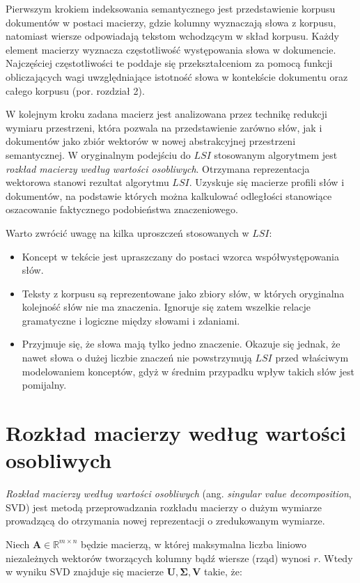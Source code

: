 \documentclass{pracamgr}
\begin{document}
Pierwszym krokiem indeksowania semantycznego jest przedstawienie korpusu dokumentów w postaci macierzy, gdzie kolumny wyznaczają słowa z korpusu, natomiast wiersze odpowiadają tekstom wchodzącym w skład korpusu. Każdy element macierzy wyznacza częstotliwość występowania słowa w dokumencie. Najczęściej częstotliwości te poddaje się przekształceniom za pomocą funkcji obliczających wagi uwzględniające istotność słowa w kontekście dokumentu oraz całego korpusu (por. rozdział 2).

W kolejnym kroku zadana macierz jest analizowana przez technikę redukcji wymiaru przestrzeni, która pozwala na przedstawienie zarówno słów, jak i dokumentów jako zbiór wektorów w nowej abstrakcyjnej przestrzeni semantycznej. W oryginalnym podejściu do $LSI$ stosowanym algorytmem jest \textit{rozkład macierzy według wartości osobliwych}. Otrzymana reprezentacja wektorowa stanowi rezultat algorytmu $LSI$. Uzyskuje się macierze profili słów i dokumentów, na podstawie których można kalkulować odległości stanowiące oszacowanie faktycznego podobieństwa znaczeniowego.

Warto zwrócić uwagę na kilka uproszczeń stosowanych w $LSI$:

\begin{itemize}
    \item Koncept w tekście jest upraszczany do postaci wzorca współwystępowania słów.
    \item Teksty z korpusu są reprezentowane jako zbiory słów, w których oryginalna kolejność słów nie ma znaczenia. Ignoruje się zatem wszelkie relacje gramatyczne i logiczne między słowami i zdaniami. 
    \item Przyjmuje się, że słowa mają tylko jedno znaczenie. Okazuje się jednak, że nawet słowa o dużej liczbie znaczeń nie powstrzymują $LSI$ przed właściwym modelowaniem konceptów, gdyż w średnim przypadku wpływ takich słów jest pomijalny.
\end{itemize}

\section{Rozkład macierzy według wartości osobliwych}
\textit{Rozkład macierzy według wartości osobliwych} (ang. \textit{singular value decomposition}, SVD) jest metodą przeprowadzania rozkładu macierzy o dużym wymiarze prowadzącą do otrzymania nowej reprezentacji o zredukowanym wymiarze.

Niech $\mathbf{A} \in \mathbb{R}^{m \times n}$ będzie macierzą, w której maksymalna liczba liniowo niezależnych wektorów tworzących kolumny bądź wiersze (rząd) wynosi $r$. Wtedy w wyniku SVD znajduje się macierze $\mathbf{U}, \mathbf{\Sigma}, \mathbf{V}$ takie, że:
\end{document}
